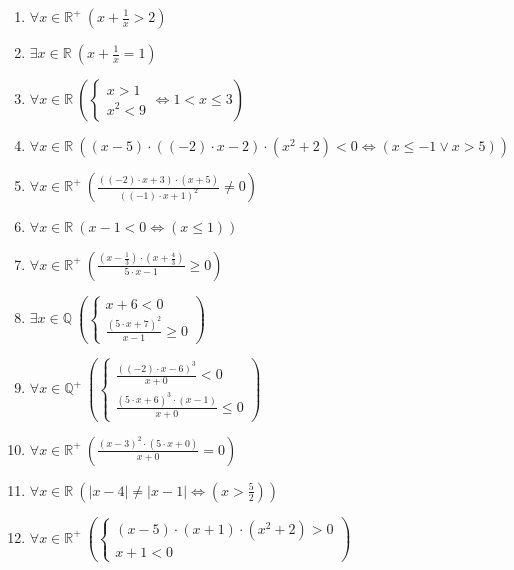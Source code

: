\documentclass[11pt,a4paper]{article}
\begin{document}
\begin{enumerate}
\item $\displaystyle \forall x \in \mathbb{R}^{+}\ \left(x + \frac{1}{x} > 2\right)$
\item $\displaystyle \exists x \in \mathbb{R}\ \left(x + \frac{1}{x} = 1\right)$
\item $\displaystyle \forall x \in \mathbb{R}\ \left(\begin{cases} x > 1 \\ x^{2} < 9 \end{cases} \iff 1 < x \le 3\right)$
\item $\displaystyle \forall x \in \mathbb{R}\ \left( \left(x - 5\right) \cdot \left(\left(-2\right) \cdot x - 2\right) \cdot \left(x^{2} + 2\right) < 0 \iff \left( x \le -1 \lor x > 5 \right) \right)$
\item $\displaystyle \forall x \in \mathbb{R}^{+}\ \left( \frac{\left(\left(-2\right) \cdot x + 3\right) \cdot \left(x + 5\right)}{\left(\left(-1\right) \cdot x + 1\right)^{2}} \neq 0 \right)$
\item $\displaystyle \forall x \in \mathbb{R}\ \left( x - 1 < 0 \iff \left( x \le 1 \right) \right)$
\item $\displaystyle \forall x \in \mathbb{R}^{+}\ \left( \frac{\left(x - \frac{1}{3}\right) \cdot \left(x + \frac{4}{3}\right)}{5 \cdot x - 1} \ge 0 \right)$
\item $\displaystyle \exists x \in \mathbb{Q}\ \left( \begin{cases} x + 6 < 0 \\ \frac{\left(5 \cdot x + 7\right)^{2}}{x - 1} \ge 0 \end{cases} \right)$
\item $\displaystyle \forall x \in \mathbb{Q}^{+}\ \left( \begin{cases} \frac{\left(\left(-2\right) \cdot x - 6\right)^{3}}{x + 0} < 0 \\ \frac{\left(5 \cdot x + 6\right)^{3} \cdot \left(x - 1\right)}{x + 0} \le 0 \end{cases} \right)$
\item $\displaystyle \forall x \in \mathbb{R}^{+}\ \left( \frac{\left(x - 3\right)^{2} \cdot \left(5 \cdot x + 0\right)}{x + 0} = 0 \right)$
\item $\displaystyle \forall x \in \mathbb{R}\ \left( \left|x - 4\right| \neq \left|x - 1\right| \iff \left( x > \frac{5}{2} \right) \right)$
\item $\displaystyle \forall x \in \mathbb{R}^{+}\ \left( \begin{cases} \left(x - 5\right) \cdot \left(x + 1\right) \cdot \left(x^{2} + 2\right) > 0 \\ x + 1 < 0 \end{cases} \right)$

\end{enumerate}
\end{document}
